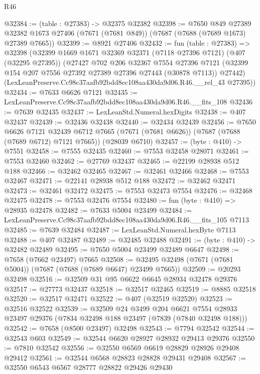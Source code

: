 \begin{lexlean}{R46}
\begin{coremodule}
@32384 := (table : @27383) -> @32375 @32382
@32398 := @7650
    @849
    @27389
    @32382
    @1673
    @27406
    (@7671 (@7681 @849))
    (@7687 (@7688 (@7689 @1673) @27389 @7665))
@32399 := @8921 @27406
@32432 := fun (table : @27383) =>
  @32398
    (@32399
      @1669
      @1671
      @32369
      @32371
      (@7118 @27396 @7121)
      (@407 (@32295 @27395))
      (@27427
        @702
        @206
        @32367
        @7554
        @27396
        @7121
        (@32399 @154 @207 @7556 @27392 @27389 @27396 @27443 (@30878 @7113))
        @27442)
      (LexLeanPreserve.Cc98c37aafb92bdd8ec108aa430da9d06.R46.__rel_43 @27395))
@32434 := @7633 @6626 @7121
@32435 := LexLeanPreserve.Cc98c37aafb92bdd8ec108aa430da9d06.R46.__fits_108
@32436 := @7639 @32435
@32437 := LexLeanStd.Numeral.hexDigits
@32438 := @407 @32437
@32439 := @32436 @32438
@32440 := @32434 @32439
@32456 := @7650
    @6626
    @7121
    @32439
    @6712
    @7665
    (@7671 (@7681 @6626))
    (@7687 (@7688 (@7689 @6712) @7121 @7665))
    (@28039 @6710)
@32457 := (byte : @410) -> @7551
@32458 := @7555 @32435
@32460 := @7553 @32458 @28071
@32461 := @7553 @32460
@32462 := @27769 @32437
@32465 := @22199 @28938 @512 @188
@32466 := @32462 @32465
@32467 := @32461 @32466
@32468 := @7553 @32467
@32471 := @22141 @28938 @512 @188
@32472 := @32462 @32471
@32473 := @32461 @32472
@32475 := @7553 @32473 @7554
@32476 := @32468 @32475
@32478 := @7553 @32476 @7554
@32480 := fun (byte : @410) => @28935 @32478
@32482 := @7633 @5004 @23499
@32484 := LexLeanPreserve.Cc98c37aafb92bdd8ec108aa430da9d06.R46.__fits_105 @7113
@32485 := @7639 @32484
@32487 := LexLeanStd.Numeral.hexByte @7113
@32488 := @407 @32487
@32489 := @32485 @32488
@32491 := (byte : @410) -> @32482 @32489
@32495 := @7650 @5004 @23499 @32489 @6647
@32498 := @7658 (@7662 @23497) @7665
@32508 := @32495 @32498 (@7671 (@7681 @5004)) (@7687 (@7688 (@7689 @6647) @23499 @7665))
@32509 := @20293 @32498
@32516 := @32509 @31 @95 @6622 @6645 @28934 @32478 @29376
@32517 := @27773 @32437
@32518 := @32517 @32465
@32519 := @8885 @32518
@32520 := @32517 @32471
@32522 := @407 (@32519 @32520)
@32523 := @32516 @32522
@32539 := @32509
    @24
    @3499
    @204
    @6621
    @7554
    @28933
    @23497
    @29376
    (@7834 @32498 @188 @23497 (@7839 (@7840 @32498 @188)))
@32542 := @7658 (@8500 @23497) @32498
@32543 := @7794 @32542
@32544 := @32543 @603
@32549 := @32544 @6620 @28927 @28932 @29413 @29376
@32550 := @7810 @32542
@32556 := @32550 @6569 @6619 @28829 @28926 @29408 @29412
@32561 := @32544 @6568 @28823 @28828 @29431 @29408
@32567 := @32550 @6543 @6567 @28777 @28822 @29426 @29430

\end{coremodule}
\end{lexlean}
